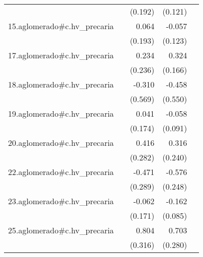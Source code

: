 {\begin{longtable}{l*{4}{D{.}{.}{-1}}}
            &                     &     (0.192)         &     (0.121)         &                     \\
\addlinespace
15.aglomerado#c.hv\_precaria&                     &       0.064         &      -0.057         &                     \\
            &                     &     (0.193)         &     (0.123)         &                     \\
\addlinespace
17.aglomerado#c.hv\_precaria&                     &       0.234         &       0.324         &                     \\
            &                     &     (0.236)         &     (0.166)         &                     \\
\addlinespace
18.aglomerado#c.hv\_precaria&                     &      -0.310         &      -0.458         &                     \\
            &                     &     (0.569)         &     (0.550)         &                     \\
\addlinespace
19.aglomerado#c.hv\_precaria&                     &       0.041         &      -0.058         &                     \\
            &                     &     (0.174)         &     (0.091)         &                     \\
\addlinespace
20.aglomerado#c.hv\_precaria&                     &       0.416         &       0.316         &                     \\
            &                     &     (0.282)         &     (0.240)         &                     \\
\addlinespace
22.aglomerado#c.hv\_precaria&                     &      -0.471         &      -0.576\sym{*}  &                     \\
            &                     &     (0.289)         &     (0.248)         &                     \\
\addlinespace
23.aglomerado#c.hv\_precaria&                     &      -0.062         &      -0.162         &                     \\
            &                     &     (0.171)         &     (0.085)         &                     \\
\addlinespace
25.aglomerado#c.hv\_precaria&                     &       0.804\sym{*}  &       0.703\sym{*}  &                     \\
            &                     &     (0.316)         &     (0.280)         &                     \\

\end{longtable}}
